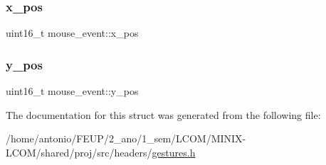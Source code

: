 \mbox{\label{structmouse__event_a899bd00c25fa2673bf40fd098f6dd247}} 
\subsubsection{\texorpdfstring{x\+\_\+pos}{x\_pos}}
{\footnotesize\ttfamily uint16\+\_\+t mouse\+\_\+event\+::x\+\_\+pos}

\mbox{\label{structmouse__event_a2d28e7073d60258a58c16b09e0f3d12f}} 
\subsubsection{\texorpdfstring{y\+\_\+pos}{y\_pos}}
{\footnotesize\ttfamily uint16\+\_\+t mouse\+\_\+event\+::y\+\_\+pos}



The documentation for this struct was generated from the following file\+:\begin{DoxyCompactItemize}
\item 
/home/antonio/\+F\+E\+U\+P/2\+\_\+ano/1\+\_\+sem/\+L\+C\+O\+M/\+M\+I\+N\+I\+X-\/\+L\+C\+O\+M/shared/proj/src/headers/\hyperlink{gestures_8h}{gestures.\+h}\end{DoxyCompactItemize}
